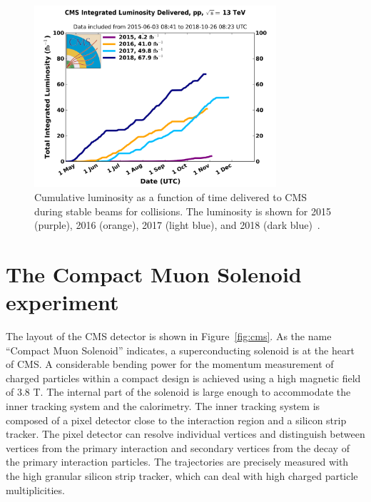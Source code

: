 \begin{figure}[htbp]
  \centering
  \includegraphics[width=0.8\textwidth]{plots/chapter3/int_lumi.png}
  \caption{Cumulative luminosity as a function of time delivered to CMS during stable beams for \pp collisions. The luminosity is shown for 2015 (purple), 2016 (orange), 2017 (light blue), and 2018 (dark blue)~\cite{lumi}.}
  \label{fig:lumi}
\end{figure}

\section{The Compact Muon Solenoid experiment}
The layout of the CMS detector is shown in Figure~\ref{fig:cms}. As the name ``Compact Muon Solenoid'' indicates, a superconducting solenoid is at the heart of CMS. A considerable bending power for the momentum measurement of charged particles within a compact design is achieved using a high magnetic field of 3.8 T. The internal part of the solenoid is large enough to accommodate the inner tracking system and the calorimetry. The inner tracking system is composed of a pixel detector close to the interaction region and a silicon strip tracker. The pixel detector can resolve individual vertices and distinguish between vertices from the primary interaction and secondary vertices from the decay of the primary interaction particles. The trajectories are precisely measured with the high granular silicon strip tracker, which can deal with high charged particle multiplicities.

